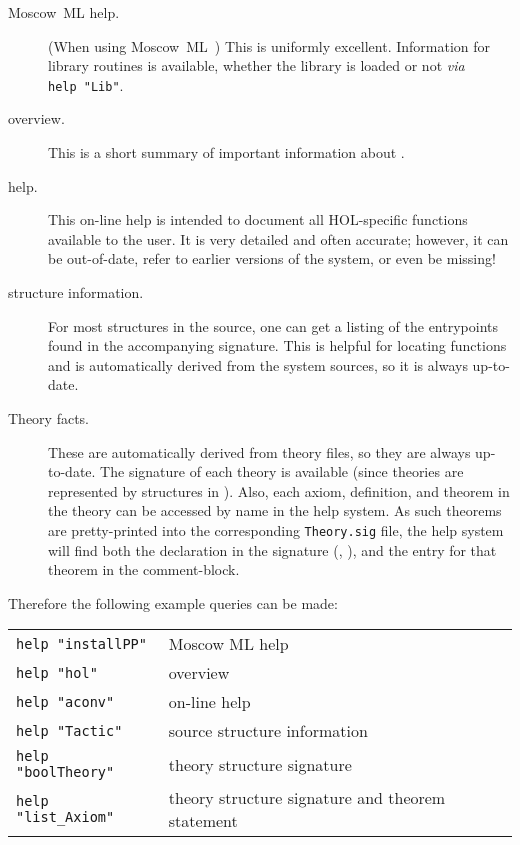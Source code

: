  \begin{description}

 \item [Moscow~ML help.]  (When using Moscow~ML~\HOL{})
   This is uniformly excellent.
   Information for library routines is available, whether the library is loaded or not \emph{via} \texttt{help~"Lib"}.

\item [\HOL{} overview.] This is a short summary of important information
  about \HOL{}.

\item [\HOL{} help.] This on-line help is intended to document all
  HOL-specific functions available to the user. It is very detailed
  and often accurate; however, it can be out-of-date, refer to earlier
  versions of the system, or even be missing!

\item [\HOL{} structure information.]
  For most structures in the \HOL{} source, one can get a listing of the entrypoints found in the accompanying signature.
  This is helpful for locating functions and is automatically derived from the system sources, so it is always up-to-date.

\item [Theory facts.]
  These are automatically derived from theory files, so they are always up-to-date.
  The signature of each theory is available (since theories are represented by structures in \HOL{}).
  Also, each axiom, definition, and theorem in the theory can be accessed by name in the help system.
  As such theorems are pretty-printed into the corresponding \texttt{Theory.sig} file, the help system will find both the declaration in the signature (\eg, ), and the entry for that theorem in the comment-block.
\end{description}

Therefore the following example queries can be made:

\begin{table}[h]
  \begin{center}
    \begin{tabular}{|l|l|} \hline
      \verb+help "installPP"+ & Moscow ML help \\
      \verb+help "hol"+ &  \HOL{} overview \\
      \verb+help "aconv"+ &  on-line \HOL{} help \\
      \verb+help "Tactic"+ & \HOL{} source structure information \\
      \verb+help "boolTheory"+ &  theory structure signature \\
      \verb+help "list_Axiom"+ & theory structure signature and theorem
      statement \\ \hline
    \end{tabular}
  \end{center}
\end{table}

